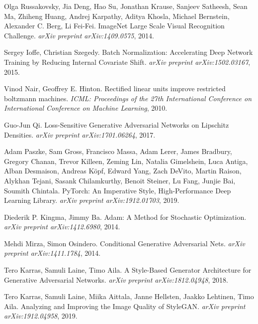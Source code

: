 \documentclass[12pt, a4paper]{article}
\begin{document}
\begin{thebibliography}{9}
	Olga Russakovsky, Jia Deng, Hao Su, Jonathan Krause, Sanjeev Satheesh, Sean Ma, Zhiheng Huang, Andrej Karpathy, Aditya Khosla, Michael Bernstein, Alexander C. Berg, Li Fei-Fei. ImageNet Large Scale Visual Recognition Challenge. \textit{arXiv preprint arXiv:1409.0575}, 2014.
	
	Sergey Ioffe, Christian Szegedy. Batch Normalization: Accelerating Deep Network Training by Reducing Internal Covariate Shift. \textit{arXiv preprint arXiv:1502.03167}, 2015.
	
	Vinod Nair, Geoffrey E. Hinton. Rectified linear units improve restricted boltzmann machines. \textit{ICML: Proceedings of the 27th International Conference on International Conference on Machine Learning}, 2010.
	
	Guo-Jun Qi. Loss-Sensitive Generative Adversarial Networks on Lipschitz Densities. \textit{arXiv preprint arXiv:1701.06264}, 2017.
	
	Adam Paszke, Sam Gross, Francisco Massa, Adam Lerer, James Bradbury, Gregory Chanan, Trevor Killeen, Zeming Lin, Natalia Gimelshein, Luca Antiga, Alban Desmaison, Andreas Köpf, Edward Yang, Zach DeVito, Martin Raison, Alykhan Tejani, Sasank Chilamkurthy, Benoit Steiner, Lu Fang, Junjie Bai, Soumith Chintala. PyTorch: An Imperative Style, High-Performance Deep Learning Library. \textit{arXiv preprint arXiv:1912.01703}, 2019.
	
	Diederik P. Kingma, Jimmy Ba. Adam: A Method for Stochastic Optimization. \textit{arXiv preprint arXiv:1412.6980}, 2014.
	
	Mehdi Mirza, Simon Osindero. Conditional Generative Adversarial Nets. \textit{arXiv preprint arXiv:1411.1784}, 2014.
	
	Tero Karras, Samuli Laine, Timo Aila. A Style-Based Generator Architecture for Generative Adversarial Networks. \textit{arXiv preprint arXiv:1812.04948}, 2018.
	
	Tero Karras, Samuli Laine, Miika Aittala, Janne Hellsten, Jaakko Lehtinen, Timo Aila. Analyzing and Improving the Image Quality of StyleGAN. \textit{arXiv preprint arXiv:1912.04958}, 2019.
\end{thebibliography}
\end{document}
